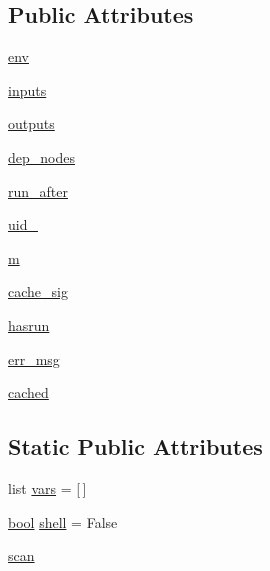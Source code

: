 \subsection*{Public Attributes}
\begin{DoxyCompactItemize}
\item 
\hyperlink{classwaflib_1_1_task_1_1_task_ace363b3fc9aa947c470a9dd8684e4d2a}{env}
\item 
\hyperlink{classwaflib_1_1_task_1_1_task_a84db2881aae1bcc2ad19c0eecf24804c}{inputs}
\item 
\hyperlink{classwaflib_1_1_task_1_1_task_a7183c692f1eb01b9f7e66daca035bce4}{outputs}
\item 
\hyperlink{classwaflib_1_1_task_1_1_task_a47519ef9cc763e953a9546fbf991c531}{dep\+\_\+nodes}
\item 
\hyperlink{classwaflib_1_1_task_1_1_task_aa7c8052cdf396076b486c3265b99b245}{run\+\_\+after}
\item 
\hyperlink{classwaflib_1_1_task_1_1_task_a0fa73ce0900838dffe62641935b02ece}{uid\+\_\+}
\item 
\hyperlink{classwaflib_1_1_task_1_1_task_a1e2f248269a53c6eb04a0e86b522043c}{m}
\item 
\hyperlink{classwaflib_1_1_task_1_1_task_a473cf17a336701b81ecccccb0eb24857}{cache\+\_\+sig}
\item 
\hyperlink{classwaflib_1_1_task_1_1_task_addb7d0750b995543d0aadcc06207ac8d}{hasrun}
\item 
\hyperlink{classwaflib_1_1_task_1_1_task_a1823deb6db2d93a5b28f6816f00566f4}{err\+\_\+msg}
\item 
\hyperlink{classwaflib_1_1_task_1_1_task_a5d2bf613bba40e022fc0e4fbbc495d7f}{cached}
\end{DoxyCompactItemize}
\subsection*{Static Public Attributes}
\begin{DoxyCompactItemize}
\item 
list \hyperlink{classwaflib_1_1_task_1_1_task_a3935d632055836871b233ce2deb9f008}{vars} = \mbox{[}$\,$\mbox{]}
\item 
\hyperlink{mac_2config_2i386_2lib-src_2libsoxr_2soxr-config_8h_abb452686968e48b67397da5f97445f5b}{bool} \hyperlink{classwaflib_1_1_task_1_1_task_a5ac5b733ffb0c6b5dcfc154e7a06d6dd}{shell} = False
\item 
\hyperlink{classwaflib_1_1_task_1_1_task_a0b77d9f2aeee1214b3d0899f1f329bf9}{scan}
\end{DoxyCompactItemize}


